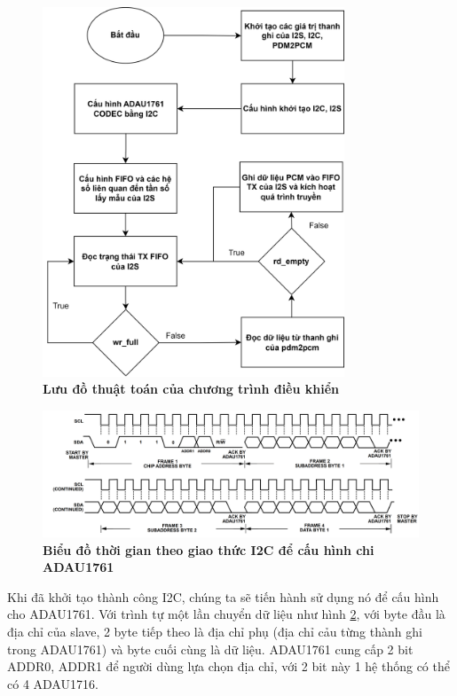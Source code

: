 \begin{figure}[H]
    \centering
    \includegraphics[width=9cm]{Images/Chuong5/fpga/flow_chart.png}
    \caption[Lưu đồ thuật toán của chương trình điều khiển]{\bfseries \fontsize{12pt}{0pt}\selectfont Lưu đồ thuật toán của chương trình điều khiển}
    \label{flow_chart}
\end{figure}

\begin{figure}[H]
    \centering
    \includegraphics[width=14cm]{Images/Chuong5/fpga/i2c_timing.png}
    \caption[Biểu đồ thời gian theo giao thức I2C để cấu hình chi ADAU1761]{\bfseries \fontsize{12pt}{0pt}\selectfont Biểu đồ thời gian theo giao thức I2C để cấu hình chi ADAU1761}
    \label{i2c_timing}
\end{figure}

Khi đã khởi tạo thành công I2C, chúng ta sẽ tiến hành sử dụng nó để cấu hình cho ADAU1761. Với trình tự một lần chuyển dữ liệu như hình \ref{i2c_timing}, với byte đầu là địa chỉ của slave, 2 byte tiếp theo là địa chỉ phụ (địa chỉ cảu từng thành ghi trong ADAU1761) và byte cuối cùng là dữ liệu. ADAU1761 cung cấp 2 bit ADDR0, ADDR1 để người dùng lựa chọn địa chỉ, với 2 bit này 1 hệ thống có thể có 4 ADAU1716.

